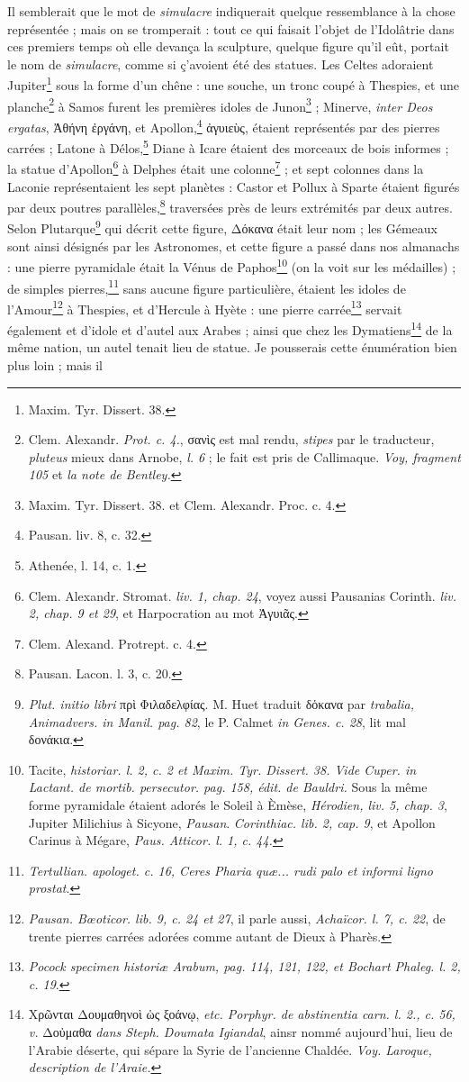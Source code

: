 \documentclass[a4paper, 11pt, oneside, polutonikogreek, french]{article}
\begin{document}
Il semblerait que le mot de \emph{simulacre} indiquerait quelque ressemblance à la chose représentée ; mais on se tromperait : tout ce qui faisait l'objet de l'Idolâtrie dans ces premiers temps où elle devança la sculpture, quelque figure qu'il eût, portait le nom de \emph{simulacre}, comme si ç'avoient été des statues. Les Celtes adoraient Jupiter\footnote{Maxim. Tyr. Dissert. 38.} sous la forme d'un chêne : une souche, un tronc coupé à Thespies, et une planche\footnote{Clem. Alexandr. \emph{Prot. c. 4.}, σανὶς est mal rendu, \emph{stipes} par le traducteur, \emph{pluteus} mieux dans Arnobe, \emph{l. 6} ; le fait est pris de Callimaque. \emph{Voy, fragment 105} et \emph{la note de Bentley.}} à Samos furent les premières idoles de Junon\footnote{Maxim. Tyr. Dissert. 38. et Clem. Alexandr. Proc. c. 4.} ; Minerve, \emph{inter Deos ergatas}, Ἀθήνη ἐργάνη, et Apollon,\footnote{Pausan. liv. 8, c. 32.} ἀγυιεὺς, étaient représentés par des pierres carrées ; Latone à Délos,\footnote{Athenée, l. 14, c. 1.} Diane à Icare étaient des morceaux de bois informes ; la statue d'Apollon\footnote{Clem. Alexandr. Stromat. \emph{liv. 1, chap. 24}, voyez aussi Pausanias Corinth. \emph{liv. 2, chap. 9 et 29}, et Harpocration au mot Ἀγυιᾶς.} à Delphes était une colonne\footnote{Clem. Alexand. Protrept. c. 4.} ; et sept colonnes dans la Laconie représentaient les sept planètes : Castor et Pollux à Sparte étaient figurés par deux poutres parallèles,\footnote{Pausan. Lacon. l. 3, c. 20.} traversées près de leurs extrémités par deux autres. Selon Plutarque\footnote{\emph{Plut. initio libri} πρὶ Φιλαδελφίας. M. Huet traduit δὁκανα par \emph{trabalia, Animadvers. in Manil. pag. 82}, le P. Calmet \emph{in Genes. c. 28}, lit mal δονάκια.} qui décrit cette figure, Δόκανα était leur nom ; les Gémeaux sont ainsi désignés par les Astronomes, et cette figure a passé dans nos almanachs : une pierre pyramidale était la Vénus de Paphos\footnote{Tacite, \emph{historiar. l. 2, c. 2 et Maxim. Tyr. Dissert. 38. Vide Cuper. in Lactant. de mortib. persecutor. pag. 158, édit. de Bauldri.} Sous la même forme pyramidale étaient adorés le Soleil à Èmèse, \emph{Hérodien, liv. 5, chap. 3}, Jupiter Milichius à Sicyone, \emph{Pausan}. \emph{Corinthiac. lib. 2, cap. 9}, et Apollon Carinus à Mégare, \emph{Paus. Atticor. l. 1, c. 44.}} (on la voit sur les médailles) ; de simples pierres,\footnote{\emph{Tertullian. apologet. c. 16, Ceres Pharia quæ... rudi palo et informi ligno prostat}.} sans aucune figure particulière, étaient les idoles de l'Amour\footnote{\emph{Pausan. Bœoticor. lib. 9, c. 24 et 27}, il parle aussi, \emph{Achaïcor. l. 7, c. 22}, de trente pierres carrées adorées comme autant de Dieux à Pharès.} à Thespies, et d'Hercule à Hyète : une pierre carrée\footnote{\emph{Pocock specimen historiæ Arabum, pag. 114, 121, 122, et Bochart Phaleg. l. 2, c. 19}.} servait également et d'idole et d'autel aux Arabes ; ainsi que chez les Dymatiens\footnote{Χρῶνται Δουμαθηνοὶ ὡς ξοάνῳ, \emph{etc. Porphyr. de abstinentia carn. l. 2., c. 56, v.} Δοὐμαθα \emph{dans Steph. Doumata Igiandal}, ainsr nommé aujourd'hui, lieu de l'Arabie déserte, qui sépare la Syrie de l'ancienne Chaldée. \emph{Voy. Laroque, description de l'Araie.}} de la même nation, un autel tenait lieu de statue. Je pousserais cette énumération bien plus loin ; mais il 
\end{document}
